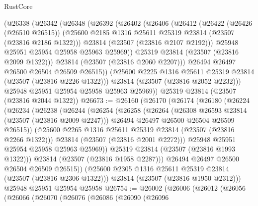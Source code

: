 \begin{lexlean}{RustCore}
\begin{coremodule}
        (@26338
          (@26342
            (@26348
              (@26392
                (@26402
                  (@26406
                    (@26412
                      (@26422
                        (@26426 (@26510 @26515))
                        (@25600 @2185 @1316 @25611 @25319 @23814 (@23507 (@23816 @2186 @1322)))
                        @23814
                        (@23507 (@23816 @2107 @2192)))
                      @25948
                      @25951
                      @25954
                      @25958
                      @25963
                      @25969))
                  @25319
                  @23814
                  (@23507 (@23816 @2099 @1322)))
                @23814
                (@23507 (@23816 @2060 @2207)))
              @26494
              @26497
              @26500
              @26504
              @26509
              @26515))
          (@25600 @2225 @1316 @25611 @25319 @23814 (@23507 (@23816 @2226 @1322)))
          @23814
          (@23507 (@23816 @2052 @2232)))
        @25948
        @25951
        @25954
        @25958
        @25963
        @25969))
    @25319
    @23814
    (@23507 (@23816 @2044 @1322))
@26673 := @26160
    (@26170
      (@26174
        (@26180
          (@26224
            (@26234
              (@26238
                (@26244
                  (@26254
                    (@26258
                      (@26264
                        (@26308 @26593 @23814 (@23507 (@23816 @2009 @2247)))
                        @26494
                        @26497
                        @26500
                        @26504
                        @26509
                        @26515))
                    (@25600 @2265 @1316 @25611 @25319 @23814 (@23507 (@23816 @2266 @1322)))
                    @23814
                    (@23507 (@23816 @2001 @2272)))
                  @25948
                  @25951
                  @25954
                  @25958
                  @25963
                  @25969))
              @25319
              @23814
              (@23507 (@23816 @1993 @1322)))
            @23814
            (@23507 (@23816 @1958 @2287)))
          @26494
          @26497
          @26500
          @26504
          @26509
          @26515))
      (@25600 @2305 @1316 @25611 @25319 @23814 (@23507 (@23816 @2306 @1322)))
      @23814
      (@23507 (@23816 @1950 @2312)))
    @25948
    @25951
    @25954
    @25958
@26754 := @26002
    (@26006
      (@26012
        (@26056
          (@26066
            (@26070
              (@26076
                (@26086
                  (@26090
                    (@26096

\end{coremodule}
\end{lexlean}
